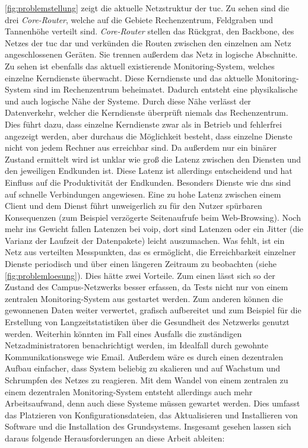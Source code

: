 \documentclass[titlepage]{report}
\begin{document}
\autoref{fig:problemstellung} zeigt die aktuelle Netzstruktur der \gls{tuc}. Zu sehen
sind die drei \emph{Core\hyp{}Router}, welche auf die Gebiete
Rechenzentrum, Feldgraben und Tannenhöhe verteilt sind.
\emph{Core\hyp{}Router} stellen das Rückgrat, den Backbone, des Netzes
der \gls{tuc} dar und verkünden die Routen zwischen den einzelnen am
Netz angeschlossenen Geräten. Sie trennen außerdem das Netz in logische
Abschnitte. Zu sehen ist ebenfalls das aktuell existierende
Monitoring-System, welches einzelne Kerndienste überwacht. Diese
Kerndienste und das aktuelle Monitoring-System sind im Rechenzentrum
beheimatet. Dadurch entsteht eine physikalische und auch logische Nähe
der Systeme. Durch diese Nähe verlässt der Datenverkehr, welcher die
Kerndienste überprüft niemals das Rechenzentrum. Dies führt dazu, dass
einzelne Kerndienste zwar als in Betrieb und fehlerfrei angezeigt
werden, aber durchaus die Möglichkeit besteht, dass einzelne Dienste
nicht von jedem Rechner aus erreichbar sind. Da außerdem nur ein binärer
Zustand ermittelt wird ist unklar wie groß die Latenz zwischen den
Diensten und den jeweiligen Endkunden ist. Diese Latenz ist allerdings
entscheidend und hat Einfluss auf die Produktivität der Endkunden.
Besonders Dienste wie \gls{dns} sind auf schnelle Verbindungen
angewiesen. Eine zu hohe Latenz zwischen einem Client und dem Dienst
führt unweigerlich zu für den Nutzer spürbaren Konsequenzen (zum
Beispiel verzögerte Seitenaufrufe beim Web-Browsing). Noch mehr ins
Gewicht fallen Latenzen bei \gls{voip}, dort sind Latenzen oder ein
Jitter (die Varianz der Laufzeit der Datenpakete\cite{JITTERWIKI})
leicht auszumachen. Was fehlt, ist ein Netz aus verteilten Messpunkten,
das es ermöglicht, die Erreichbarkeit einzelner Dienste periodisch und
über einen längeren Zeitraum zu beobachten (siehe \autoref{fig:problemloesung}). Dies
hätte zwei Vorteile.  Zum einen lässt sich so der Zustand des
Campus-Netzwerks besser erfassen, da Tests nicht nur von einem zentralen
Monitoring-System aus gestartet werden. Zum anderen können die
gewonnenen Daten weiter verwertet, grafisch aufbereitet und zum Beispiel
für die Erstellung von Langzeitstatistiken über die Gesundheit des
Netzwerks genutzt werden.  Weiterhin könnten im Fall eines Ausfalls die
zuständigen Netzadministratoren benachrichtigt werden, im Idealfall
durch gewohnte Kommunikationswege wie Email. Außerdem wäre es durch
einen dezentralen Aufbau einfacher, dass System beliebig zu skalieren
und auf Wachstum und Schrumpfen des Netzes zu reagieren. Mit dem Wandel
von einem zentralen zu einem dezentralen Monitoring-System entsteht
allerdings auch mehr Arbeitsaufwand, denn auch diese Systeme müssen
gewartet werden. Dies umfasst das Platzieren von Konfigurationsdateien,
das Aktualisieren und Installieren von Software und die Installation des
Grundsystems.  Insgesamt gesehen lassen sich daraus folgende
Herausforderungen an diese Arbeit ableiten:
\end{document}
